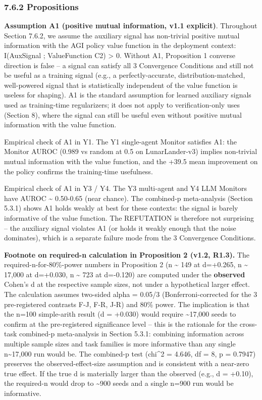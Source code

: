 \documentclass[
]{article}
\begin{document}
\subsubsection{7.6.2 Propositions}\label{propositions}

\textbf{Assumption A1 (positive mutual information, v1.1 explicit)}.
Throughout Section 7.6.2, we assume the auxiliary signal has non-trivial
positive mutual information with the AGI policy value function in the
deployment context: I(AuxSignal ; ValueFunction \textbar{} C2)
\textgreater{} 0. Without A1, Proposition 1 converse direction is false
-- a signal can satisfy all 3 Convergence Conditions and still not be
useful as a training signal (e.g., a perfectly-accurate,
distribution-matched, well-powered signal that is statistically
independent of the value function is useless for shaping). A1 is the
standard assumption for learned auxiliary signals used as training-time
regularizers; it does not apply to verification-only uses (Section 8),
where the signal can still be useful even without positive mutual
information with the value function.

Empirical check of A1 in Y1. The Y1 single-agent Monitor satisfies A1:
the Monitor AUROC (0.989 vs random at 0.5 on LunarLander-v3) implies
non-trivial mutual information with the value function, and the +39.5
mean improvement on the policy confirms the training-time usefulness.

Empirical check of A1 in Y3 / Y4. The Y3 multi-agent and Y4 LLM Monitors
have AUROC \textasciitilde{} 0.50-0.65 (near chance). The combined-p
meta-analysis (Section 5.3.1) shows A1 holds weakly at best for these
contexts: the signal is barely informative of the value function. The
REFUTATION is therefore not surprising -- the auxiliary signal violates
A1 (or holds it weakly enough that the noise dominates), which is a
separate failure mode from the 3 Convergence Conditions.

\textbf{Footnote on required-n calculation in Proposition 2 (v1.2,
R1.3).} The required-n-for-80\%-power numbers in Proposition 2 (n
\textasciitilde{} 149 at d=+0.265, n \textasciitilde{} 17,000 at
d=+0.030, n \textasciitilde{} 723 at d=-0.120) are computed under the
\textbf{observed} Cohen's d at the respective sample sizes, not under a
hypothetical larger effect. The calculation assumes two-sided alpha =
0.05/3 (Bonferroni-corrected for the 3 pre-registered contrasts F-J,
F-R, J-R) and 80\% power. The implication is that the n=100 simple-arith
result (d = +0.030) would require \textasciitilde17,000 seeds to confirm
at the pre-registered significance level -- this is the rationale for
the cross-task combined-p meta-analysis in Section 5.3.1: combining
information across multiple sample sizes and task families is more
informative than any single n\textasciitilde17,000 run would be. The
combined-p test (chi\^{}2 = 4.646, df = 8, p = 0.7947) preserves the
observed-effect-size assumption and is consistent with a near-zero true
effect. If the true d is materially larger than the observed (e.g., d =
+0.10), the required-n would drop to \textasciitilde900 seeds and a
single n=900 run would be informative.
\end{document}

